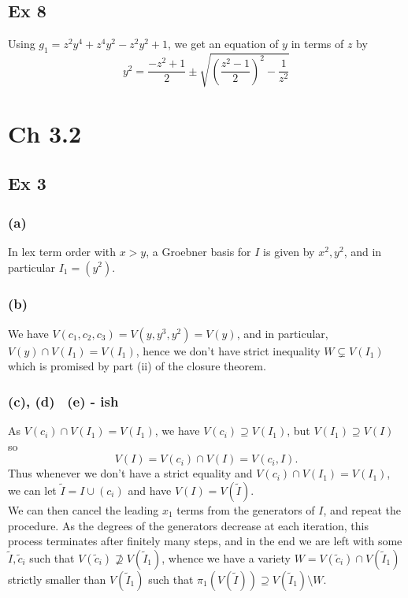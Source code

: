 \documentclass{article}
\theoremstyle{definition}
\begin{document}
\subsection*{Ex 8}

Using $g_1 = z^2y^4 + z^4y^2 - z^2y^2 + 1$, we get an equation of $y$ in terms
of $z$ by
\[
	y^2 
	= 
	\frac{-z^2 + 1}{2} \pm
	\sqrt{
		\left(\frac{z^2 - 1}{2}\right)^2
		-
		\frac{1}{z^2}
	}
\] 

\section*{Ch 3.2}
\subsection*{Ex 3}
\subsubsection*{(a)}
In lex term order with $x > y$, a Groebner basis for $I$ is given 
by $x^2, y^2$, and in particular $I_1 = (y^2)$.
\subsubsection*{(b)}
We have $V(c_1,c_2,c_3) = V(y, y^3, y^2) = V(y)$, and in particular, $V(y) \cap
V(I_1) = V(I_1)$, hence we don't have strict inequality $W \subsetneq V(I_1)$
which is promised by part (ii) of the closure theorem.

\subsubsection*{(c), (d) \ (e) - ish}
As $V(c_i) \cap V(I_1) = V(I_1)$, we have $V(c_i) \supseteq V(I_1)$, but
$V(I_1) \supseteq V(I)$ so
\[
	V(I) = V(c_i) \cap V(I) = V(c_i, I).
\] 
Thus whenever we don't have a strict equality and $V(c_i) \cap V(I_1) =
V(I_1)$, we can let $\widetilde{I} = I \cup (c_i)$ and have $V(I) =
V(\widetilde{I})$. \\

We can then cancel the leading $x_1$ terms from the generators of $I$, and
repeat the procedure. As the degrees of the generators decrease at each
iteration, this process terminates after finitely many steps, and in the end we
are left with some $\widetilde{I}, \widetilde{c}_i$ such that
$V(\widetilde{c}_i) \not \supseteq V(\widetilde{I}_1)$, whence we have a
variety $W = V(\widetilde{c}_i) \cap V(\widetilde{I}_1)$ strictly smaller than
$V(\widetilde{I}_1)$ such that $\pi_1(V(\widetilde{I})) \supseteq
V(\widetilde{I}_1) \setminus W$.
\end{document}
